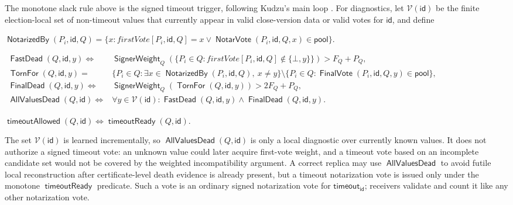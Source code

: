 \documentclass[sigplan,twocolumn,review,anonymous]{acmart}
\newcommand{\func}[1]{\operatorname{\mathsf{#1}}}
\newcommand{\NotarVote}{\func{NotarVote}}
\newcommand{\FinalVote}{\func{FinalVote}}
\newcommand{\id}{\mathsf{id}}
\newcommand{\timeoutVal}{\mathsf{timeout}}
\newcommand{\NotarizedBy}{\func{NotarizedBy}}
\newcommand{\timeoutReady}{\func{timeoutReady}}
\newcommand{\timeoutAllowed}{\func{timeoutAllowed}}
\newcommand{\FastDead}{\func{FastDead}}
\newcommand{\FinalDead}{\func{FinalDead}}
\newcommand{\TornFor}{\func{TornFor}}
\newcommand{\AllValuesDead}{\func{AllValuesDead}}
\newcommand{\Values}{\mathcal{V}}
\newcommand{\SignerWeight}{\func{SignerWeight}}
\begin{document}
The monotone slack rule above is the signed timeout trigger, following Kudzu's main loop
\cite{shoup2025kudzu}.  For diagnostics, let \(\Values(\id)\) be the finite election-local set of
non-timeout values that currently appear in valid close-version data or valid votes for \(\id\), and
define
\begin{center}
\begin{adjustbox}{max width=\columnwidth}
\(\displaystyle
\NotarizedBy(P_i,\id,Q)=
\{x:firstVote[P_i,\id,Q]=x\vee\NotarVote(P_i,\id,Q,x)\in\mathsf{pool}\}.
\)
\end{adjustbox}
\end{center}
\begin{center}
\begin{adjustbox}{max width=\columnwidth}
\(\displaystyle
\begin{aligned}
\FastDead(Q,\id,y)\iff{}&
\SignerWeight_Q(\{P_i\in Q:firstVote[P_i,\id,Q]\notin\{\bot,y\}\})>F_Q+P_Q,\\
\TornFor(Q,\id,y)={}&
\{P_i\in Q:\exists x\in\NotarizedBy(P_i,\id,Q),\ x\neq y\}
\setminus\{P_i\in Q:\FinalVote(P_i,\id,Q,y)\in\mathsf{pool}\},\\
\FinalDead(Q,\id,y)\iff{}&
\SignerWeight_Q(\TornFor(Q,\id,y))>2F_Q+P_Q,\\
\AllValuesDead(Q,\id)\iff{}&
\forall y\in\Values(\id):\FastDead(Q,\id,y)\wedge\FinalDead(Q,\id,y).
\end{aligned}
\)
\end{adjustbox}
\end{center}
\begin{center}
\begin{adjustbox}{max width=\columnwidth}
\(\displaystyle
\timeoutAllowed(Q,\id)\iff \timeoutReady(Q,\id).
\)
\end{adjustbox}
\end{center}
The set \(\Values(\id)\) is learned incrementally, so \(\AllValuesDead(Q,\id)\) is only a local
diagnostic over currently known values.  It does not authorize a signed timeout vote: an unknown value
could later acquire first-vote weight, and a timeout vote based on an incomplete candidate set would not
be covered by the weighted incompatibility argument.  A correct replica may use \(\AllValuesDead\) to
avoid futile local reconstruction after certificate-level death evidence is already present, but a
timeout notarization vote is issued only under the monotone \(\timeoutReady\) predicate.  Such a vote is
an ordinary signed notarization vote for \(\timeoutVal_\id\); receivers validate and count it like any
other notarization vote.
\end{document}
